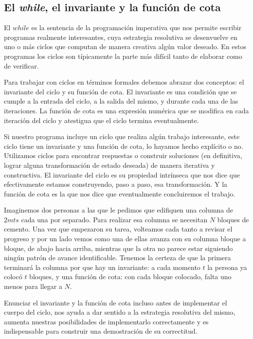 \documentclass[12pt, a4paper, openany, fleqn]{book}
\begin{document}
    \vspace{1em}

    \subsection{El \textit{while}, el invariante y la función de cota}
    El $while$ es la sentencia de la programación imperativa que nos permite escribir programas realmente interesantes, cuya estrategia resolutiva se desenvuelve en uno o más ciclos que computan de manera creativa algún valor deseado. En estos programas los ciclos son típicamente la parte más difícil tanto de elaborar como de verificar.

    Para trabajar con ciclos en términos formales debemos abrazar dos conceptos: el invariante del ciclo y su función de cota.
    El invariante es una condición que se cumple a la entrada del ciclo, a la salida del mismo, y durante cada una de las iteraciones. La función de cota es una expresión numérica que se modifica en cada iteración del ciclo y atestigua que el ciclo termina eventualmente.

    Si nuestro programa incluye un ciclo que realiza algún trabajo interesante, este ciclo tiene un invariante y una función de cota, lo hayamos hecho explícito o no. Utilizamos ciclos para encontrar respuestas o construir soluciones (en definitiva, lograr alguna transformación de estado deseada) de manera iterativa y constructiva. El invariante del ciclo es su propiedad intrínseca que nos dice que efectivamente estamos construyendo, paso a paso, esa transformación. Y la función de cota es la que nos dice que eventualmente concluiremos el trabajo.

    Imaginemos dos personas a las que le pedimos que edifiquen una columna de $2mts$ cada una por separado. Para realizar esa columna se necesitan $N$ bloques de cemento. Una vez que empezaron su tarea, volteamos cada tanto a revisar el progreso y por un lado vemos como una de ellas avanza con su columna bloque a bloque, de abajo hacia arriba, mientras que la otra no parece estar siguiendo ningún patrón de avance identificable. Tenemos la certeza de que la primera terminará la columna por que hay un invariante: a cada momento $t$ la persona ya colocó $t$ bloques, y una función de cota: con cada bloque colocado, falta uno menos para llegar a $N$.

    Enunciar el invariante y la función de cota incluso antes de implementar el cuerpo del ciclo, nos ayuda a dar sentido a la estrategia resolutiva del mismo, aumenta nuestras posibilidades de implementarlo correctamente y es indispensable para construir una demostración de su correctitud.
\end{document}

